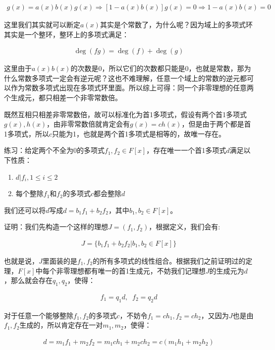 \documentclass[12pt, a4paper, oneside]{ctexart}
\theoremstyle{definition}
\begin{document}
\begin{align*}
g(x)=a(x)b(x)g(x)\Rightarrow [1-a(x)b(x)]g(x)=0\Rightarrow 1-a(x)b(x)=0
\end{align*}

这里我们其实就可以断定$a(x)$其实是个常数了，为什么呢？因为域上的多项式环其实是一个整环，整环上的多项式满足：

\begin{align*}
\deg(fg)=\deg(f)+\deg(g)
\end{align*}

这里由于$a(x)b(x)$的次数是0，所以它们的次数都只能是0，也就是常数，那为什么常数多项式一定会有逆元呢？这也不难理解，任意一个域上的常数的逆元都可以作为常数多项式出现在多项式环里面。所以综上可得：同一个非零理想的任意两个生成元，都只相差一个非零常数倍。

既然互相只相差非零常数倍，故可以标准化为首1多项式，假设有两个首1多项式$g(x),h(x)$，由非零常数倍就肯定会有$g(x)=ch(x)$，但是由于两个都是首1多项式，所以$c$只能为1，也就是两个首1多项式是相等的，故唯一存在。

练习：给定两个不全为0的多项式$f_1,f_2\in F[x]$，存在唯一一个首1多项式$d$满足以下性质：
\begin{enumerate}
\item $d|f_i,1\leqslant i\leqslant 2$
\item 每个整除$f_1$和$f_2$的多项式$c$都会整除$d$
\end{enumerate}
我们还可以将$d$写成$d=b_1f_1+b_2f_2$，其中$b_1,b_2\in F[x]$。

证明：我们先构造一个这样的理想$J=(f_1,f_2)$，根据定义，我们会有:

\begin{align*}
J=\{b_1f_1+b_2f_2|b_1,b_2\in F[x]\}
\end{align*}

也就是说，$J$里面装的是$f_1,f_2$的所有多项式的线性组合。根据我们之前证明过的定理，$F[x]$中每个非零理想都有唯一的首1生成元，不妨我们记理想$J$的生成元为$d$，那么就会存在$q_1,q_2$，使得：

\begin{align*}
f_1=q_1d,\;\;f_2=q_2d
\end{align*}

对于任意一个能够整除$f_1,f_2$的多项式$c$，不妨令$f_1=ch_1,f_2=ch_2$，又因为$J$也是由$f_1,f_2$生成的，所以肯定存在一对$m_1,m_2$，使得：

\begin{align*}
d=m_1f_1+m_2f_2=m_1ch_1+m_2ch_2=c(m_1h_1+m_2h_2)
\end{align*}
\end{document}
